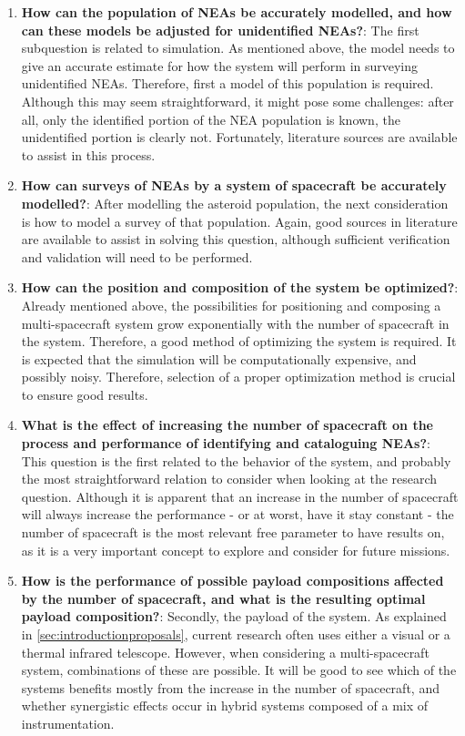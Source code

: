 \begin{enumerate}
 \item \textbf{How can the population of NEAs be accurately modelled, and how can these models be adjusted for unidentified NEAs?}: The first subquestion is related to simulation. As mentioned above, the model needs to give an accurate estimate for how the system will perform in surveying unidentified NEAs. Therefore, first a model of this population is required. Although this may seem straightforward, it might pose some challenges: after all, only the identified portion of the NEA population is known, the unidentified portion is clearly not. Fortunately, literature sources are available to assist in this process.
 \item \textbf{How can surveys of NEAs by a system of spacecraft be accurately modelled?}: After modelling the asteroid population, the next consideration is how to model a survey of that population. Again, good sources in literature are available to assist in solving this question, although sufficient verification and validation will need to be performed.
 \item \textbf{How can the position and composition of the system be optimized?}: Already mentioned above, the possibilities for positioning and composing a multi-spacecraft system grow exponentially with the number of spacecraft in the system. Therefore, a good method of optimizing the system is required. It is expected that the simulation will be computationally expensive, and possibly noisy. Therefore, selection of a proper optimization method is crucial to ensure good results.
 \item \textbf{What is the effect of increasing the number of spacecraft on the process and performance of identifying and cataloguing NEAs?}: This question is the first related to the behavior of the system, and probably the most straightforward relation to consider when looking at the research question. Although it is apparent that an increase in the number of spacecraft will always increase the performance - or at worst, have it stay constant - the number of spacecraft is the most relevant free parameter to have results on, as it is a very important concept to explore and consider for future missions.
 \item \textbf{How is the performance of possible payload compositions affected by the number of spacecraft, and what is the resulting optimal payload composition?}: Secondly, the payload of the system. As explained in \autoref{sec:introductionproposals}, current research often uses either a visual or a thermal infrared telescope. However, when considering a multi-spacecraft system, combinations of these are possible. It will be good to see which of the systems benefits mostly from the increase in the number of spacecraft, and whether synergistic effects occur in hybrid systems composed of a mix of instrumentation. 

\end{enumerate}
